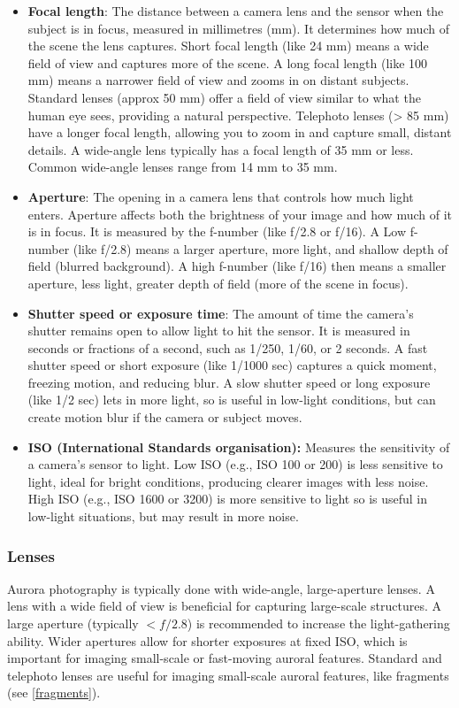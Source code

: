 \documentclass{article}
\begin{document}
\begin{itemize}
    \item {\bf Focal length}: The distance between a camera lens and the sensor when the subject is in focus, measured in millimetres (mm). It determines how much of the scene the lens captures. Short focal length (like 24 mm) means a wide field of view and captures more of the scene. A long focal length (like 100 mm) means a narrower field of view and zooms in on distant subjects. Standard lenses (approx 50 mm) offer a field of view similar to what the human eye sees, providing a natural perspective. Telephoto lenses (> 85 mm) have a longer focal length, allowing you to zoom in and capture small, distant details. A wide-angle lens typically has a focal length of 35 mm or less. Common wide-angle lenses range from 14 mm to 35 mm.
    
    \item {\bf Aperture}: The opening in a camera lens that controls how much light enters. Aperture affects both the brightness of your image and how much of it is in focus. It is measured by the f-number (like f/2.8 or f/16). A Low f-number (like f/2.8) means a larger aperture, more light, and shallow depth of field (blurred background). A high f-number (like f/16) then means a smaller aperture, less light, greater depth of field (more of the scene in focus).

    \item {\bf Shutter speed or exposure time}: The amount of time the camera's shutter remains open to allow light to hit the sensor. It is measured in seconds or fractions of a second, such as 1/250, 1/60, or 2 seconds. A fast shutter speed or short exposure (like 1/1000 sec) captures a quick moment, freezing motion, and reducing blur. A slow shutter speed or long exposure (like 1/2 sec) lets in more light, so is useful in low-light conditions, but can create motion blur if the camera or subject moves.

\item {\bf ISO (International Standards organisation):} Measures the sensitivity of a camera's sensor to light. Low ISO (e.g., ISO 100 or 200) is less sensitive to light, ideal for bright conditions, producing clearer images with less noise. High ISO (e.g., ISO 1600 or 3200) is more sensitive to light so is useful in low-light situations, but may result in more noise.
\end{itemize}

\subsubsection{Lenses}
Aurora photography is typically done with wide-angle, large-aperture lenses. A lens with a wide field of view is beneficial for capturing large-scale structures. A large aperture (typically $<f/2.8$) is recommended to increase the light-gathering ability. Wider apertures allow for shorter exposures at fixed ISO, which is important for imaging small-scale or fast-moving auroral features. Standard and telephoto lenses are useful for imaging small-scale auroral features, like fragments (see \ref{fragments}).
\end{document}
